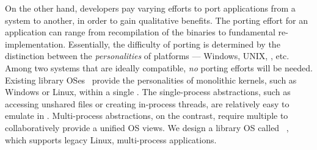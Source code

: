 On the other hand, developers pay varying efforts to port applications
from a system to another,
in order to gain qualitative benefits.
The porting effort for an application can range from
recompilation of the binaries
to fundamental re-implementation.
Essentially,
the difficulty of porting is determined by the distinction between the \emph{personalities} of platforms
--- Windows, UNIX, \liboses{}, etc.
Among two systems that are ideally compatible, \emph{no} porting efforts will be needed.
Existing library OSes~\citep{porter11drawbridge, baumann13bascule, baumann14haven}
provide the personalities of monolithic kernels, such as Windows or Linux,
within a single \picoproc{}.
The single-process abstractions,
such as accessing unshared files or creating in-process threads,
are relatively easy to emulate in \liboses{}.
Multi-process abstractions, on the contrast, require
multiple \picoprocs{} to collaboratively provide a unified OS views.
We design a library OS called \term{\graphene{}}~\citep{tsai14graphene},
which supports legacy Linux, multi-process applications.
